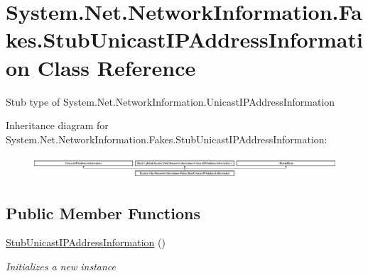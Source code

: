 \hypertarget{class_system_1_1_net_1_1_network_information_1_1_fakes_1_1_stub_unicast_i_p_address_information}{\section{System.\-Net.\-Network\-Information.\-Fakes.\-Stub\-Unicast\-I\-P\-Address\-Information Class Reference}
\label{class_system_1_1_net_1_1_network_information_1_1_fakes_1_1_stub_unicast_i_p_address_information}
}


Stub type of System.\-Net.\-Network\-Information.\-Unicast\-I\-P\-Address\-Information 


Inheritance diagram for System.\-Net.\-Network\-Information.\-Fakes.\-Stub\-Unicast\-I\-P\-Address\-Information\-:\begin{figure}[H]
\begin{center}
\leavevmode
\includegraphics[height=0.829630cm]{class_system_1_1_net_1_1_network_information_1_1_fakes_1_1_stub_unicast_i_p_address_information}
\end{center}
\end{figure}
\subsection*{Public Member Functions}
\begin{DoxyCompactItemize}
\item 
\hyperlink{class_system_1_1_net_1_1_network_information_1_1_fakes_1_1_stub_unicast_i_p_address_information_ad45d3024fd7b8a2e2c70510b2430fa6e}{Stub\-Unicast\-I\-P\-Address\-Information} ()
\begin{DoxyCompactList}\small\item\em Initializes a new instance\end{DoxyCompactList}\end{DoxyCompactItemize}
